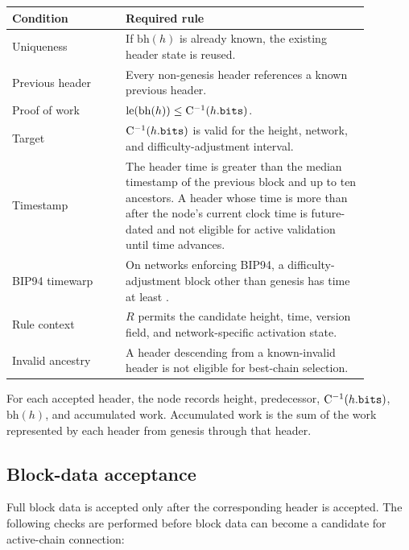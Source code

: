 \begin{longtable}{@{}L{0.28\linewidth}L{0.60\linewidth}@{}}
\toprule
Condition & Required rule \\
\midrule
Uniqueness & If \(\mathrm{bh}(h)\) is already known, the existing header state is reused. \\
Previous header & Every non-genesis header references a known previous header. \\
Proof of work & \(\mathrm{le}(\mathrm{bh}(h)) \le \mathrm{C}^{-1}(h.\text{\texttt{bits}})\). \\
Target & \(\mathrm{C}^{-1}(h.\text{\texttt{bits}})\) is valid for the height, network, and difficulty-adjustment interval. \\
Timestamp & The header time is greater than the median timestamp of the previous block and up to ten ancestors. A header whose time is more than  after the node's current clock time is future-dated and not eligible for active validation until time advances. \\
BIP94 timewarp & On networks enforcing BIP94, a difficulty-adjustment block other than genesis has time at least . \\
Rule context & \(R\) permits the candidate height, time, version field, and network-specific activation state. \\
Invalid ancestry & A header descending from a known-invalid header is not eligible for best-chain selection. \\
\bottomrule
\end{longtable}

For each accepted header, the node records height, predecessor,
\(\mathrm{C}^{-1}(h.\text{\texttt{bits}})\), \(\mathrm{bh}(h)\), and accumulated
work. Accumulated work is the sum of the work represented by each header from
genesis through that header.

\subsection{Block-data acceptance}

Full block data is accepted only after the corresponding header is accepted.
The following checks are performed before block data can become a candidate for
active-chain connection:


